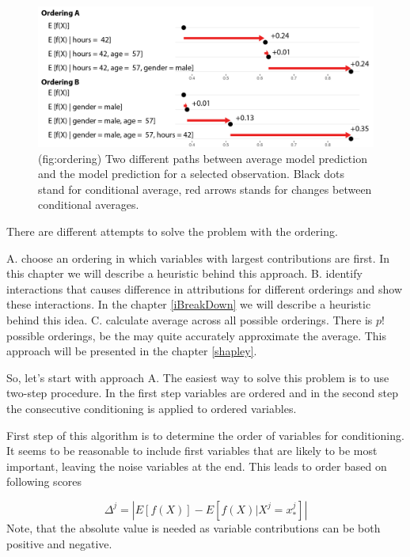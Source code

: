 \documentclass[12pt,]{krantz}
\theoremstyle{definition}
\theoremstyle{definition}
\theoremstyle{definition}
\theoremstyle{remark}
\begin{document}
\begin{figure}

{\centering \includegraphics[width=1\linewidth]{figure/ordering} 

}

\caption{(fig:ordering) Two different paths between average model prediction and the model prediction for a selected observation. Black dots stand for conditional average, red arrows stands for changes between conditional averages.}\label{fig:ordering}
\end{figure}

There are different attempts to solve the problem with the ordering.

A. choose an ordering in which variables with largest contributions are
first. In this chapter we will describe a heuristic behind this
approach. B. identify interactions that causes difference in
attributions for different orderings and show these interactions. In the
chapter \ref{iBreakDown} we will describe a heuristic behind this idea.
C. calculate average across all possible orderings. There is \(p!\)
possible orderings, be the may quite accurately approximate the average.
This approach will be presented in the chapter \ref{shapley}.

So, let's start with approach A. The easiest way to solve this problem
is to use two-step procedure. In the first step variables are ordered
and in the second step the consecutive conditioning is applied to
ordered variables.

First step of this algorithm is to determine the order of variables for
conditioning. It seems to be reasonable to include first variables that
are likely to be most important, leaving the noise variables at the end.
This leads to order based on following scores

\[
\Delta^j = \left| E [f(X)] - E [f(X)|X^j = x_*^j] \right|
\] Note, that the absolute value is needed as variable contributions can
be both positive and negative.
\end{document}
